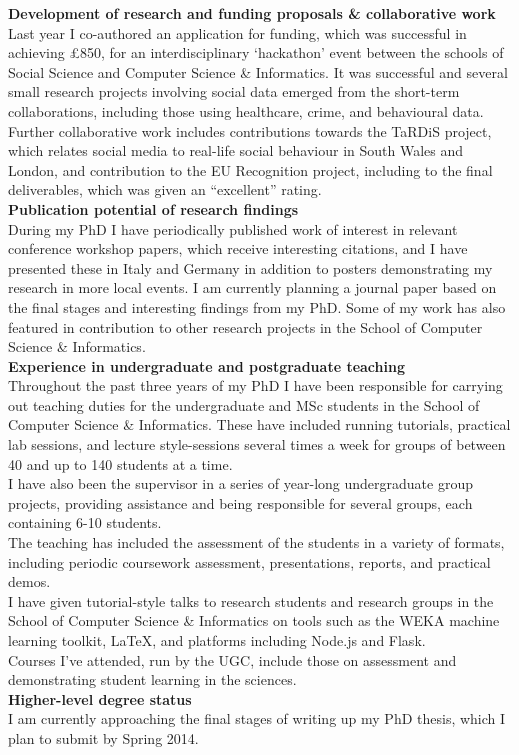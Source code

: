 \documentclass[11pt,a4paper]{article}
\begin{document}
\textbf{Development of research and funding proposals \& collaborative work}\\
Last year I co-authored an application for funding, which was successful in achieving £850, for an interdisciplinary `hackathon' event between the schools of Social Science and Computer Science \& Informatics. It was successful and several small research projects involving social data emerged from the short-term collaborations, including those using healthcare, crime, and behavioural data.\\
Further collaborative work includes contributions towards the TaRDiS project, which relates social media to real-life social behaviour in South Wales and London, and contribution to the EU Recognition project, including to the final deliverables, which was given an ``excellent'' rating.\\

\textbf{Publication potential of research findings}\\
During my PhD I have periodically published work of interest in relevant conference workshop papers, which receive interesting citations, and I have presented these in Italy and Germany in addition to posters demonstrating my research in more local events. I am currently planning a journal paper based on the final stages and interesting findings from my PhD. Some of my work has also featured in contribution to other research projects in the School of Computer Science \& Informatics.\\

\textbf{Experience in undergraduate and postgraduate teaching}\\
Throughout the past three years of my PhD I have been responsible for carrying out teaching duties for the undergraduate and MSc students in the School of Computer Science \& Informatics. These have included running tutorials, practical lab sessions, and lecture style-sessions several times a week for groups of between 40 and up to 140 students at a time.\\
I have also been the supervisor in a series of year-long undergraduate group projects, providing assistance and being responsible for several groups, each containing 6-10 students.\\
The teaching has included the assessment of the students in a variety of formats, including periodic coursework assessment, presentations, reports, and practical demos.\\
I have given tutorial-style talks to research students and research groups in the School of Computer Science \& Informatics on tools such as the WEKA machine learning toolkit, \LaTeX, and platforms including Node.js and Flask.\\
Courses I've attended, run by the UGC, include those on assessment and demonstrating student learning in the sciences.\\

\textbf{Higher-level degree status}\\
I am currently approaching the final stages of writing up my PhD thesis, which I plan to submit by Spring 2014.
\end{document}
